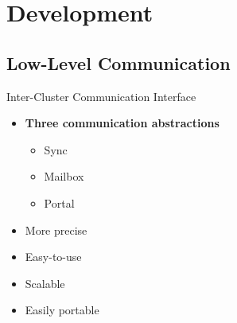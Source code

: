 \section{Development}

	\subsection{Low-Level Communication}

		\begin{frame}[fragile]{Inter-Cluster Communication Interface}

			\begin{itemize}
				\item \textbf{Three communication abstractions}
				\begin{itemize}
					\item Sync
					\item Mailbox
					\item Portal
				\end{itemize}
				\item More precise
				\item Easy-to-use
				\item Scalable
				\item Easily portable
			\end{itemize}


		\end{frame}


